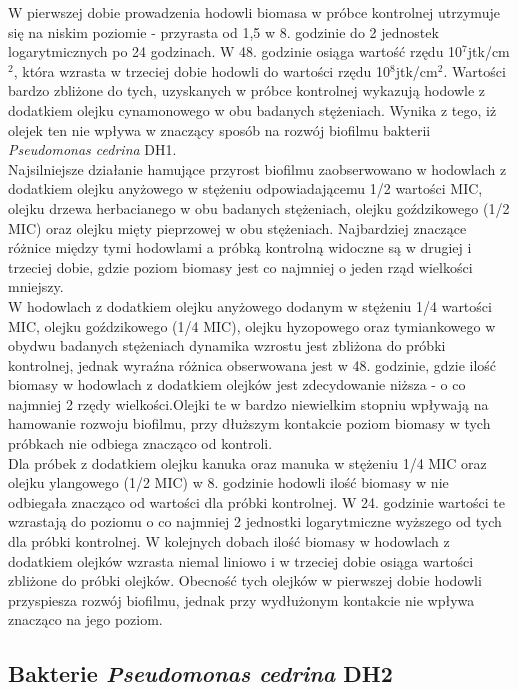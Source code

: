 \documentclass[11pt,a4paper]{report}
\begin{document}
\clearpage
W pierwszej dobie prowadzenia hodowli biomasa w próbce kontrolnej utrzymuje się na niskim poziomie - przyrasta od 1,5 w 8. godzinie do 2 jednostek logarytmicznych po 24 godzinach. W 48. godzinie osiąga wartość rzędu 10$^7$jtk/cm$^2$, która wzrasta w trzeciej dobie hodowli do wartości rzędu 10$^8$jtk/cm$^2$. Wartości bardzo zbliżone do tych, uzyskanych w próbce kontrolnej wykazują hodowle z dodatkiem olejku cynamonowego w obu badanych stężeniach. Wynika z tego, iż olejek ten nie wpływa w znaczący sposób na rozwój biofilmu bakterii \textit{Pseudomonas cedrina} DH1.\\
Najsilniejsze działanie hamujące przyrost biofilmu zaobserwowano w hodowlach z dodatkiem olejku anyżowego w stężeniu odpowiadającemu 1/2 wartości MIC, olejku drzewa herbacianego w obu badanych stężeniach, olejku goździkowego (1/2 MIC) oraz olejku mięty pieprzowej w obu stężeniach. Najbardziej znaczące różnice między tymi hodowlami a próbką kontrolną widoczne są w drugiej i trzeciej dobie, gdzie poziom biomasy jest co najmniej o jeden rząd wielkości mniejszy.\\
W hodowlach z dodatkiem olejku anyżowego dodanym w stężeniu 1/4 wartości MIC, olejku goździkowego (1/4 MIC), olejku hyzopowego oraz tymiankowego w obydwu badanych stężeniach dynamika wzrostu jest zbliżona do próbki kontrolnej, jednak wyraźna różnica obserwowana jest w 48. godzinie, gdzie ilość biomasy w hodowlach z dodatkiem olejków jest zdecydowanie niższa - o co najmniej 2 rzędy wielkości.Olejki te w bardzo niewielkim stopniu wpływają na hamowanie rozwoju biofilmu, przy dłuższym kontakcie poziom biomasy w tych próbkach nie odbiega znacząco od kontroli.\\
Dla próbek z dodatkiem olejku kanuka oraz manuka w stężeniu 1/4 MIC oraz olejku ylangowego (1/2 MIC) w 8. godzinie hodowli ilość biomasy w nie odbiegała znacząco od wartości dla próbki kontrolnej. W 24. godzinie wartości te wzrastają do poziomu o co najmniej 2 jednostki logarytmiczne wyższego od tych dla próbki kontrolnej. W kolejnych dobach ilość biomasy w hodowlach z dodatkiem olejków wzrasta niemal liniowo i w trzeciej dobie osiąga wartości zbliżone do próbki olejków. Obecność tych olejków w pierwszej dobie hodowli przyspiesza rozwój biofilmu, jednak przy wydłużonym kontakcie nie wpływa znacząco na jego poziom.
\clearpage

\subsection{Bakterie \textit{Pseudomonas cedrina} DH2}
\end{document}
